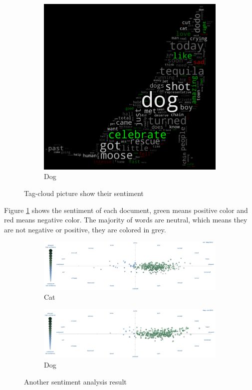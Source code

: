 \documentclass[12pt]{article}
\begin{document}
\begin{figure}[h!]
\begin{subfigure}[b]{0.437\linewidth}
    \includegraphics[width=\linewidth]{../Sentiment/tag_dog.png}
    \caption{Dog}
  \end{subfigure}
  \caption{Tag-cloud picture show their sentiment}
  \label{fig:tagcloud}
\end{figure}

Figure \ref{fig:tagcloud} shows the sentiment of each document, green means positive color and red means negative color. The majority of words are neutral, which means they are not negative or positive, they are colored in grey.

\begin{figure}[h!]
  \centering
  \begin{subfigure}[b]{0.6\linewidth}
    \includegraphics[width=\linewidth]{../Sentiment/cat.png}
    \caption{Cat}
  \end{subfigure}
  \begin{subfigure}[b]{0.6\linewidth}
    \includegraphics[width=\linewidth]{../Sentiment/dog.png}
    \caption{Dog}
  \end{subfigure}
  \caption{Another sentiment analysis result}
  \label{fig:twitter}
\end{figure}
\end{document}
